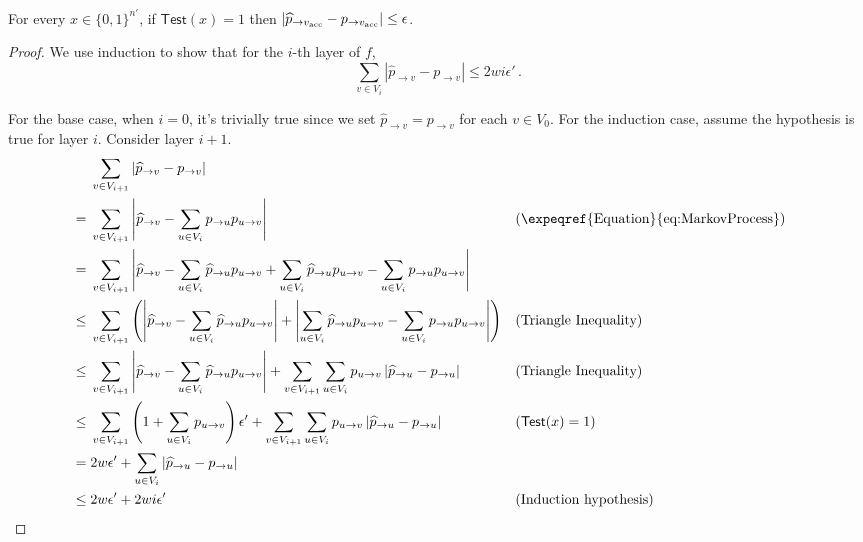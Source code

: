 \begin{lemma} \label{lem:PassingTestGivesGoodApprox}
For every $x \in \{0, 1\}^{n'}$, if $ \mathsf{Test}(x) = 1 $ then $ \left| \widehat{p}_{ \to v_{\normalfont\text{acc}}} - p_{ \to v_{\normalfont\text{acc}} } \right| \leq \epsilon$.
\end{lemma}

\begin{proof}
We use induction to show that for the $i$-th layer of $f$,
\[ \sum_{v\in  V_i} \left|\widehat{p}_{\to v} - p_{ \to v} \right| \leq 2wi\epsilon'\,. \]

For the base case, when $i=0$, it's trivially true since we set $\widehat{p}_{\to v} = p_{\to v}$ for each $v \in V_0$. For the induction case, assume the hypothesis is true for layer $i$. Consider layer $i+1$.  
\begin{align}
& \sum_{v\in V_{i+1}} \left| \widehat{p}_{\to v} - p_{\to v} \right| \nonumber \\
={} & \sum_{v\in V_{i+1}} \left| \widehat{p}_{\to v} - \sum_{u\in V_i } p_{\to u} p_{u\to v} \right| 
&& (\text{\expeqref{Equation}{eq:MarkovProcess}}) \nonumber \\
={} & \sum_{v\in V_{i+1}} \left|  \widehat{p}_{ \to v} - \sum_{u\in V_i} \widehat{p}_{ \to u} p_{u\to v} +  \sum_{u\in V_i} \widehat{p}_{ \to u} p_{u\to v} - \sum_{u\in V_i} p_{ \to u}  p_{u\to v} \right|        \nonumber \\
\leq{} &\sum_{v\in V_{i+1}} \left(  \left|  \widehat{p}_{ \to v} - \sum_{u\in V_i} \widehat{p}_{ \to u} p_{u\to v} \right|  +  \left|  \sum_{u\in V_i} \widehat{p}_{ \to u}  p_{u\to v} - \sum_{u\in V_i} p_{ \to u}  p_{u\to v}  \right| \right) && \text{(Triangle Inequality)}    \nonumber \\
\leq{} & \sum_{v\in V_{i+1}} \left| \widehat{p}_{ \to v} - \sum_{u\in V_i} \widehat{p}_{ \to u} p_{u\to v} \right| + \sum_{v\in V_{i+1}} \sum_{u\in V_i} p_{u\to v} \left| \widehat{p}_{ \to u} - p_{ \to u} \right|     
&& \text{(Triangle Inequality)} \nonumber \\
\leq{} & \sum_{v\in V_{i+1}} \left( 1 + \sum_{u\in V_i} p_{u \to v} \right) \epsilon' + \sum_{v\in V_{i+1}} \sum_{u\in V_i} p_{u\to v} \left| \widehat{p}_{ \to u} - p_{ \to u} \right|
&& ( \mathsf{Test}(x) =1   ) \nonumber \\
={} & 2w\epsilon' + \sum_{u\in V_i} |\widehat{p}_{ \to u} -p_{ \to u}|
&&
\label{eqn:test-sufficient}\\
\leq{} & 2w\epsilon' + 2wi\epsilon'
&& \text{(Induction hypothesis)} \nonumber\\

\end{align}
\end{proof}
